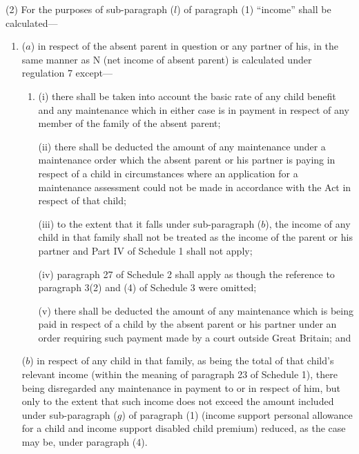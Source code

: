 \documentclass[a4paper]{article}
\begin{document}
(2) For the purposes of sub-paragraph ($l$) of paragraph (1) “income” shall be calculated—
\begin{enumerate}\item[]
($a$) in respect of the absent parent in question or any partner of his, in the same manner as N (net income of absent parent) is calculated under regulation 7 except—
\begin{enumerate}\item[]
(i) there shall be taken into account the basic rate of any child benefit and any maintenance which in either case is in payment in respect of any member of the family of the absent parent;

(ii) there shall be deducted the amount of any maintenance under a maintenance order which the absent parent or his partner is paying in respect of a child in circumstances where an application for a maintenance assessment could not be made in accordance with the Act in respect of that child; 

(iii) to the extent that it falls under sub-paragraph ($b$), the income of any child in that family shall not be treated as the income of the parent or his partner and Part IV of Schedule 1 shall not apply; 

(iv) paragraph 27 of Schedule 2 shall apply as though the reference to paragraph 3(2) and (4) of Schedule 3 were omitted;

(v) there shall be deducted the amount of any maintenance which is being paid in respect of a child by the absent parent or his partner under an order requiring such payment made by a court outside Great Britain; and
\end{enumerate}

($b$) in respect of any child in that family, as being the total of 
that child’s relevant income (within the meaning of paragraph 23 of Schedule 1), there being disregarded any maintenance in payment to or in respect of him,  %
but only to the extent that such income does not exceed the amount included under sub-paragraph ($g$) of paragraph (1) (income support personal allowance for a child and income support disabled child premium) reduced, as the case may be, under paragraph (4).
\end{enumerate}
\end{document}

